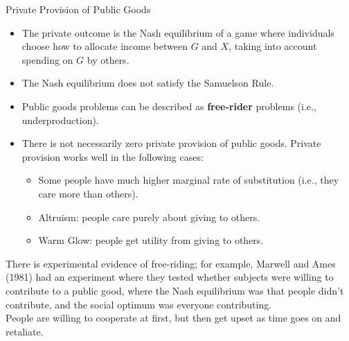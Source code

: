 \documentclass[10pt]{extarticle}
\begin{document}
  \begin{problem}{Private Provision of Public Goods}
    \begin{itemize}
      \item The private outcome is the Nash equilibrium of a game where individuals choose how to allocate income between $G$ and $X$, taking into account spending on $G$ by others.
      \item The Nash equilibrium does not satisfy the Samuelson Rule.
      \item Public goods problems can be described as \textbf{free-rider} problems (i.e., underproduction).
      \item There is not necessarily zero private provision of public goods. Private provision works well in the following cases:
        \begin{itemize}
          \item Some people have much higher marginal rate of substitution (i.e., they care more than others).
          \item Altruism: people care purely about giving to others.
          \item Warm Glow: people get utility from giving to others.
        \end{itemize}
    \end{itemize}
    There is experimental evidence of free-riding; for example, Marwell and Ames (1981) had an experiment where they tested whether subjects were willing to contribute to a public good, where the Nash equilibrium was that people didn't contribute, and the social optimum was everyone contributing.\\

    People are willing to cooperate at first, but then get upset as time goes on and retaliate.
  \end{problem}
\end{document}
